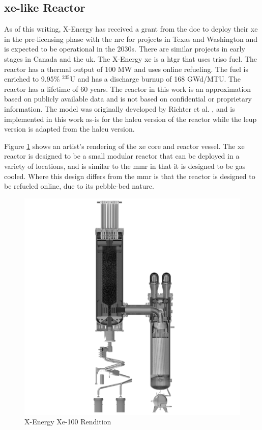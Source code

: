 \subsection{\gls{xe}-like Reactor}
\label{sec:xe}

As of this writing, X-Energy has received a grant from the \gls{doe} to deploy their \gls{xe} in the pre-licensing phase with the \gls{nrc} for projects in Texas and Washington and is expected to be operational in the 2030s. There are similar projects in early stages in Canada and the \gls{uk}. The X-Energy \gls{xe} is a \gls{htgr} that uses \gls{triso} fuel. The reactor has a thermal output of 100 MW and uses online refueling. The fuel is enriched to 9.95\% $^{235}$U and has a discharge burnup of 168 GWd/MTU. The reactor has a lifetime of 60 years. The reactor in this work is an approximation based on publicly available data and is not based on confidential or proprietary information. The model was originally developed by Richter et al. \cite{richter_xe100_like}, and is implemented in this work as-is for the \gls{haleu} version of the reactor while the \gls{leup} version is adapted from the \gls{haleu} version.

Figure \ref{fig:xe_design} shows an artist's rendering of the \gls{xe} core and reactor vessel. The \gls{xe} reactor is designed to be a small modular reactor that can be deployed in a variety of locations, and is similar to the \gls{mmr} in that it is designed to be gas cooled. Where this design differs from the \gls{mmr} is that the reactor is designed to be refueled online, due to its pebble-bed nature.

\begin{figure}[!htbp]
    \centering
    \includegraphics[scale=0.09]{images/reactor_design/xe-100-reactor-slice.jpg}
    \caption{X-Energy Xe-100 Rendition \cite{xe_reactor}}
    \label{fig:xe_design}
\end{figure}

